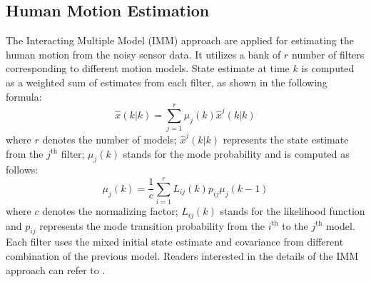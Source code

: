 \documentclass[letterpaper, 10 pt, conference]{ieeeconf}
\begin{document}
	\subsection{Human Motion Estimation}\label{subsec:human_track}
	The Interacting Multiple Model (IMM) approach are applied for estimating the human motion from the noisy sensor data.
	It utilizes a bank of $r$ number of filters corresponding to different motion models.
	State estimate at time $k$ is computed as a weighted sum of estimates from each filter, as shown in the following formula:
	\[
	\hat{x}(k|k)=\sum\limits_{j=1}^{r}\mu_j(k)\hat{x}^j(k|k)
	\]
	where $r$ denotes the number of models; $\hat{x}^j(k|k)$ represents the state estimate from the $j^\text{th}$ filter; $\mu_j(k)$ stands for the mode probability and is computed as follows:
	\[
	\mu_j(k)=\frac{1}{c}\sum\limits_{i=1}^{r}L_{ij}(k)p_{ij}\mu_j(k-1)
	\]
	where $c$ denotes the normalizing factor; $L_{ij}(k)$ stands for the likelihood function and $p_{ij}$ represents the mode transition probability from the $i^\text{th}$ to the $j^\text{th}$ model. 
	Each filter uses the mixed initial state estimate and covariance from different combination of the previous model. 
	Readers interested in the details of the IMM approach can refer to \cite{yaakov2002estimation}.
	
\end{document}
